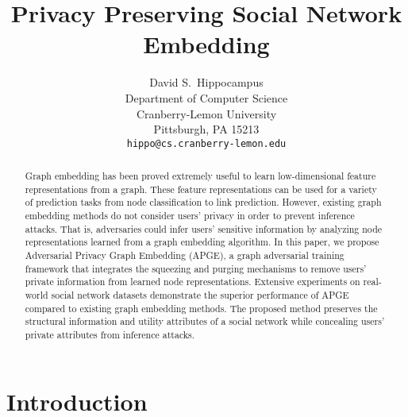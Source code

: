 \documentclass{article}
\title{Privacy Preserving Social Network Embedding}
\author{%
  David S.~Hippocampus \\
  Department of Computer Science\\
  Cranberry-Lemon University\\
  Pittsburgh, PA 15213 \\
  \texttt{hippo@cs.cranberry-lemon.edu} \\
}
\begin{document}
\maketitle

\begin{abstract}
Graph embedding has been proved extremely useful to learn low-dimensional feature representations from a graph. These feature representations can be used for a variety of prediction tasks from node classification to link prediction. However, existing graph embedding methods do not consider users' privacy in order to prevent inference attacks. That is, adversaries could infer users' sensitive information by analyzing node representations learned from a graph embedding algorithm. In this paper, we propose Adversarial Privacy Graph Embedding (APGE), a graph adversarial training framework that integrates the squeezing and purging mechanisms to remove users' private information from learned node representations. Extensive experiments on real-world social network datasets demonstrate the superior performance of APGE compared to existing graph embedding methods. The proposed method preserves the structural information and utility attributes of a social network while concealing users' private attributes from inference attacks.
\end{abstract}


\section{Introduction}
\end{document}

